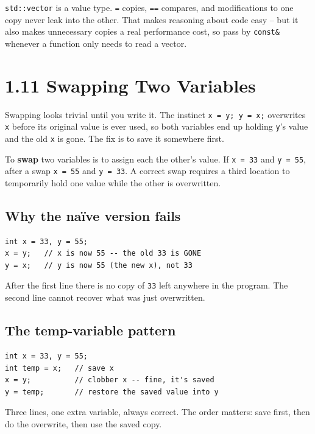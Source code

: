 \documentclass[11pt]{article}
\begin{document}
\begin{ideabox}
\texttt{std::vector} is a value type. \texttt{=} copies,
\texttt{==} compares, and modifications to one copy never leak into
the other. That makes reasoning about code easy -- but it also makes
unnecessary copies a real performance cost, so pass by
\texttt{const\&} whenever a function only needs to read a vector.
\end{ideabox}

\section{1.11 Swapping Two Variables}

Swapping looks trivial until you write it. The instinct
\texttt{x = y; y = x;} overwrites \texttt{x} before its original value is
ever used, so both variables end up holding \texttt{y}'s value and the old
\texttt{x} is gone. The fix is to save it somewhere first.

\begin{defnbox}[Swap]
To \textbf{swap} two variables is to assign each the other's value. If
\texttt{x = 33} and \texttt{y = 55}, after a swap \texttt{x = 55} and
\texttt{y = 33}. A correct swap requires a third location to temporarily
hold one value while the other is overwritten.
\end{defnbox}

\subsection{Why the na\"ive version fails}

\begin{examplebox}
\begin{verbatim}
int x = 33, y = 55;
x = y;   // x is now 55 -- the old 33 is GONE
y = x;   // y is now 55 (the new x), not 33
\end{verbatim}
After the first line there is no copy of \texttt{33} left anywhere in the
program. The second line cannot recover what was just overwritten.
\end{examplebox}

\subsection{The temp-variable pattern}

\begin{examplebox}
\begin{verbatim}
int x = 33, y = 55;
int temp = x;   // save x
x = y;          // clobber x -- fine, it's saved
y = temp;       // restore the saved value into y
\end{verbatim}
Three lines, one extra variable, always correct. The order matters:
save first, then do the overwrite, then use the saved copy.
\end{examplebox}
\end{document}
